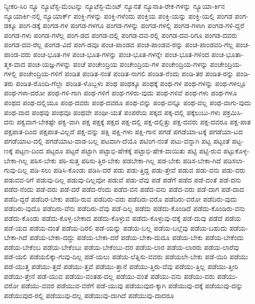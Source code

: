 {ನ್ಯೀಕರಿ-ಸಿರಿ
ನ್ಯೂ
ನ್ಯೂಟೆಸ್ಟ-ಮೆಂಟನ್ನು
ನ್ಯೂಟೆಸ್ಟ-ಮೆಂಟ್
ನ್ಯೂನತೆ
ನ್ಯೂನಾತಿ-ರೇಕ-ಗಳನ್ನು
ನ್ಯೂಯಾ-ರ್ಕಿನ
ನ್ಯೂಯಾರ್ಕಿ-ನಲ್ಲಿ
ನ್ಯೂಯಾರ್ಕ್
ಪಂಕ್ತಿ-ಗಳನ್ನು
ಪಂಕ್ತಿ-ಗಳೆಂದು
ಪಂಕ್ತಿಯ
ಪಂಕ್ತಿ-ಯನ್ನು
ಪಂಕ್ತಿ-ಯಲ್ಲಿ
ಪಂಗಡ
ಪಂಗ-ಡಕ್ಕೂ
ಪಂಗ-ಡಕ್ಕೆ
ಪಂಗಡ-ಗಳ
ಪಂಗಡ-ಗಳಗೂ
ಪಂಗಡ-ಗಳನ್ನು
ಪಂಗಡ-ಗಳಲ್ಲಿ
ಪಂಗಡ-ಗಳಾಗಿ
ಪಂಗಡ-ಗಳಿ-ದ್ದರೆ
ಪಂಗಡ-ಗಳು
ಪಂಗಡ-ಗಳೆಲ್ಲ
ಪಂಗ-ಡದ
ಪಂಗಡ-ದಲ್ಲಿ
ಪಂಗಡ-ದವ-ರಲ್ಲಿ
ಪಂಗಡ-ದವ-ರಿಗೂ
ಪಂಗಡ-ದವರು
ಪಂಗಡ-ದವ-ರೆಲ್ಲ
ಪಂಗಡ-ವಿದೆ
ಪಂಗ-ಡವೂ
ಪಂಚ-ಪಾಂಡವ
ಪಂಚ-ಪಾಂಡವ-ರನ್ನು
ಪಂಚ-ಪಾಂಡವರಿ-ಗೆಲ್ಲ
ಪಂಚ-ಪಾಂಡ-ವರು
ಪಂಚ-ಭೂತ-ಗಳ
ಪಂಚ-ಭೂತ-ಗಳನ್ನು
ಪಂಚ-ಭೂತ-ಗಳನ್ನೇ
ಪಂಚ-ಭೂತ-ಗಳಿಂದ
ಪಂಚ-ಭೂತಾ-ತ್ಮಕ-ವಾದ
ಪಂಚ-ಯಜ್ಞ-ಗಳನ್ನು
ಪಂಚೆ
ಪಂಚೇಂದ್ರಿಯ
ಪಂಚೇಂದ್ರಿಯ-ಗಳ
ಪಂಚೇಂದ್ರಿಯ-ಗಳನ್ನು
ಪಂಚೇಂದ್ರಿಯ-ಗಳಲ್ಲಿ
ಪಂಚೇಂದ್ರಿಯ-ಗಳಿಗೆ
ಪಂಡಿತ
ಪಂಡಿತ-ನಂತೆ
ಪಂಡಿತ-ನಾಗಲಿ
ಪಂಡಿತ-ನೆಂದು
ಪಂಡಿ-ತರ
ಪಂಡಿತ-ರನ್ನು
ಪಂಡಿ-ತರು
ಪಂಡಿತ-ರೊಂದಿ-ಗೆಲ್ಲಾ
ಪಂಡಿತ-ಳೊಬ್ಬಳು
ಪಂಥ
ಪಂಥಕ್ಕೂ
ಪಂಥಕ್ಕೆ
ಪಂಥ-ಗಳ
ಪಂಥ-ಗಳನ್ನು
ಪಂಥ-ಗಳಲ್ಲೂ
ಪಂಥ-ಗಳಾ-ದರೋ
ಪಂಥ-ಗಳಿ-ಗಾಗಿ
ಪಂಥ-ಗಳಿಗೆ
ಪಂಥ-ಗಳಿರು-ವುದು
ಪಂಥ-ಗಳಿವೆ
ಪಂಥ-ಗಳು
ಪಂಥ-ಗಳೂ
ಪಂಥದ
ಪಂಥ-ದಲ್ಲಿಯೂ
ಪಂಥ-ದವರು
ಪಂಥ-ದವರೂ
ಪಂಥ-ವನ್ನು
ಪಂಥ-ವನ್ನೂ
ಪಂಥ-ವಲ್ಲ
ಪಂಥ-ವಾಗು-ವುದು
ಪಂಥ-ವಾದ
ಪಂಥವು
ಪಂಥವೂ
ಪಂಥವೇ
ಪಂಥೀ-ಯತೆ
ಪಂಪರೆಯ
ಪಕ್ಕದ
ಪಕ್ಕ-ದಲ್ಲಿ
ಪಕ್ಕೆಲುಬು-ಗಳು
ಪಕ್ರಮಿಸಿ-ದನು
ಪಕ್ವವಾಗ-ಬೇಕಷ್ಟೇ
ಪಕ್ವ-ವಾಗಿ
ಪಕ್ಷ
ಪಕ್ಷಕ್ಕೆ
ಪಕ್ಷದ
ಪಕ್ಷ-ದಲ್ಲಿ
ಪಕ್ಷ-ದಲ್ಲಿತ್ತು
ಪಕ್ಷ-ದವರು
ಪಕ್ಷ-ದವರೂ
ಪಕ್ಷ-ಪಾತ
ಪಕ್ಷಪಾತ-ದಿಂದ
ಪಕ್ಷಪಾತ-ವಿಲ್ಲದೆ
ಪಕ್ಷ-ವನ್ನು
ಪಕ್ಷಿ
ಪಕ್ಷಿ-ಗಳು
ಪಕ್ಷಿ-ಗಾನ
ಪಗಡೆ
ಪಗಡೆಯಾ-ಟಕ್ಕೆ
ಪಗಡೆಯಾ-ಟದ
ಪಗಡೆಯಾಟ-ದಲ್ಲಿ
ಪಗಡೆಯಾಟ-ವಾಡ-ಬಲ್ಲ
ಪಟವಾಗಿ-ದೆಯೊ
ಪಟಿಂಗ-ನಂತೆ
ಪಟು-ವನ್ನಾಗಿ
ಪಟ್ಟ
ಪಟ್ಟಂತೆ
ಪಟ್ಟ-ಣಕ್ಕೆ
ಪಟ್ಟಣ-ದಿಂದ
ಪಟ್ಟರೂ
ಪಟ್ಟರೆ
ಪಟ್ಟಾಗಿ
ಪಟ್ಟಾಭಿ-ಷೇಕಕ್ಕೆ
ಪಟ್ಟಾಭಿ-ಷೇಕ-ವಾಯಿತು
ಪಟ್ಟಿ
ಪಟ್ಟಿ-ರುವ
ಪಟ್ಟುಕೊಳ್ಳ-ಬೇಕಾ-ಗಿಲ್ಲ
ಪಠಿಸ-ಬೇಕು
ಪಠಿ-ಸುತ್ತ
ಪಠಿಸು-ತ್ತಿರ-ಬೇಕು
ಪಡಬೇಕಾ-ಗಿಲ್ಲ
ಪಡ-ಬೇಕು
ಪಡಿಸ-ಬೇಕಾ-ಗಿದೆ
ಪಡಿಸಲಾ-ಗುವು-ದಿಲ್ಲ
ಪಡಿ-ಸಲು
ಪಡಿಸಿ-ಕೊಂಡು
ಪಡಿಸಿ-ದರೆ
ಪಡು
ಪಡು-ತ್ತಿದ್ದ
ಪಡು-ತ್ತೇವೆ
ಪಡುವ
ಪಡು-ವನು
ಪಡು-ವರು
ಪಡುವವ-ರಿಗೆ
ಪಡುವು-ದಿಲ್ಲ
ಪಡುವು-ದಿಲ್ಲವೋ
ಪಡುವೆ
ಪಡು-ವೆವು
ಪಡೆ
ಪಡೆಗೆ
ಪಡೆದ
ಪಡೆ-ದಂತೆ
ಪಡೆ-ದನು
ಪಡೆದ-ನೆಂದು
ಪಡೆ-ದರು
ಪಡೆ-ದರೆ
ಪಡೆದ-ರೆಂದು
ಪಡೆದ-ವನ
ಪಡೆದ-ವನು
ಪಡೆದ-ವರು
ಪಡೆ-ದಾಗ
ಪಡೆ-ದಾದ
ಪಡೆದಿ-ದ್ದರೆ
ಪಡೆದಿರ-ಬೇಕು
ಪಡೆದಿ-ರುವ
ಪಡೆದಿರು-ವರು
ಪಡೆದಿರು-ವರೊ
ಪಡೆದಿರು-ವರೋ
ಪಡೆದಿರು-ವುದು
ಪಡೆದಿರು-ವುದೊ
ಪಡೆದಿರು-ವೆನು
ಪಡೆದಿರು-ವೆವು
ಪಡೆ-ದಿಲ್ಲ
ಪಡೆದು
ಪಡೆದು-ಕೊಂಡಿದೆ
ಪಡೆದು-ಕೊಂಡಿರು-ವನು
ಪಡೆದು-ಕೊಂಡು
ಪಡೆದು-ಕೊಳ್ಳ-ಬೇಕಾದ
ಪಡೆದು-ಕೊಳ್ಳುವ
ಪಡೆದು-ಕೊಳ್ಳುವು-ದಕ್ಕೆ
ಪಡೆ-ದುವು
ಪಡೆದೆ
ಪಡೆಯ
ಪಡೆ-ಯದ
ಪಡೆಯ-ದಂತೆ
ಪಡೆಯ-ದಿರಲಿ
ಪಡೆ-ಯನ್ನು
ಪಡೆಯ-ಬಲ್ಲ
ಪಡೆಯ-ಬಲ್ಲೆವು
ಪಡೆಯ-ಬಹುದು
ಪಡೆಯ-ಬೇಕಾ-ಗಿದೆ
ಪಡೆಯ-ಬೇಕಾ-ದದ್ದು
ಪಡೆಯ-ಬೇಕಾ-ದರೆ
ಪಡೆಯ-ಬೇಕಾ-ದುದೂ
ಪಡೆಯ-ಬೇಕು
ಪಡೆಯ-ಬೇಕೆಂದು
ಪಡೆಯ-ಬೇಕೆಂಬ
ಪಡೆಯ-ಬೇಕೆಂಬು
ಪಡೆಯ-ಬೇಕೆಂಬು-ದರ
ಪಡೆಯ-ಲಾರ
ಪಡೆಯ-ಲಾರರು
ಪಡೆಯ-ಲಾರೆವು
ಪಡೆ-ಯಲಿ
ಪಡೆಯಲಿಕ್ಕಾ-ಗುವು-ದಿಲ್ಲ
ಪಡೆ-ಯಲು
ಪಡೆಯ-ಲೆತ್ನಿಸು-ವವರು
ಪಡೆಯಲೇ-ಬೇಕು
ಪಡೆ-ಯಿರಿ
ಪಡೆಯು
ಪಡೆ-ಯುತ್ತ
ಪಡೆಯು-ತ್ತದೆ
ಪಡೆಯು-ತ್ತವೆ
ಪಡೆಯು-ತ್ತಾನೆ
ಪಡೆಯು-ತ್ತಿರು-ವೆವು
ಪಡೆಯು-ತ್ತಿಲ್ಲ
ಪಡೆಯು-ತ್ತೀರಿ
ಪಡೆಯು-ತ್ತೇನೆ
ಪಡೆ-ಯುವ
ಪಡೆಯು-ವಂತಹ-ದಲ್ಲ
ಪಡೆಯು-ವಂತೆ
ಪಡೆಯು-ವನು
ಪಡೆಯು-ವರು
ಪಡೆಯು-ವರೋ
ಪಡೆಯು-ವವರ
ಪಡೆಯುವ-ವರೆಗೆ
ಪಡೆ-ಯುವು
ಪಡೆಯುವುದ-ಕ್ಕಾಗಿ
ಪಡೆಯುವು-ದಕ್ಕೆ
ಪಡೆಯುವು-ದನ್ನು
ಪಡೆಯುವುದ-ರಲ್ಲಿ
ಪಡೆಯುವು-ದಲ್ಲ
ಪಡೆಯುವು-ದಾಗಿದೆ
ಪಡೆಯುವು-ದಾದರೂ
}
